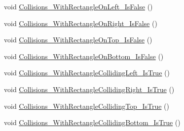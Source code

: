 \begin{DoxyCompactItemize}
\item 
void \hyperlink{class_athena_test_1_1_engine___tests_1_1_primatives___testing_1_1_bounding_box2_d_test_a811dbc683ce58909a122fff735dfe023}{Collisions\-\_\-\-With\-Rectangle\-On\-Left\-\_\-\-Is\-False} ()
\item 
void \hyperlink{class_athena_test_1_1_engine___tests_1_1_primatives___testing_1_1_bounding_box2_d_test_a5725631a824182dd461fc2b777883565}{Collisions\-\_\-\-With\-Rectangle\-On\-Right\-\_\-\-Is\-False} ()
\item 
void \hyperlink{class_athena_test_1_1_engine___tests_1_1_primatives___testing_1_1_bounding_box2_d_test_a2348fd929c05203dde7b6f6ec31a02e2}{Collisions\-\_\-\-With\-Rectangle\-On\-Top\-\_\-\-Is\-False} ()
\item 
void \hyperlink{class_athena_test_1_1_engine___tests_1_1_primatives___testing_1_1_bounding_box2_d_test_a4e1d418e0444dd2cb1af4c6aab97491b}{Collisions\-\_\-\-With\-Rectangle\-On\-Bottom\-\_\-\-Is\-False} ()
\item 
void \hyperlink{class_athena_test_1_1_engine___tests_1_1_primatives___testing_1_1_bounding_box2_d_test_a74c52f0f3b503af6de2d82bf2d02f94f}{Collisions\-\_\-\-With\-Rectangle\-Colliding\-Left\-\_\-\-Is\-True} ()
\item 
void \hyperlink{class_athena_test_1_1_engine___tests_1_1_primatives___testing_1_1_bounding_box2_d_test_a95cbedda9768c9f4d2047abb77ac56ac}{Collisions\-\_\-\-With\-Rectangle\-Colliding\-Right\-\_\-\-Is\-True} ()
\item 
void \hyperlink{class_athena_test_1_1_engine___tests_1_1_primatives___testing_1_1_bounding_box2_d_test_a64b55edab13de45e6744603e9096a66a}{Collisions\-\_\-\-With\-Rectangle\-Colliding\-Top\-\_\-\-Is\-True} ()
\item 
void \hyperlink{class_athena_test_1_1_engine___tests_1_1_primatives___testing_1_1_bounding_box2_d_test_a34a6ce5cb02017b51c8f47755d4a6aa3}{Collisions\-\_\-\-With\-Rectangle\-Colliding\-Bottom\-\_\-\-Is\-True} ()
\end{DoxyCompactItemize}


